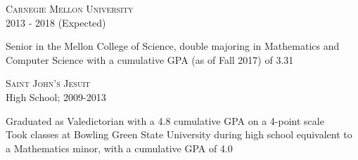 \documentclass[letterpaper,10pt]{article}
\newenvironment{resumecols2}[2]
{
    \vspace{.075cm}
    \begin{minipage}[t]{.22\textwidth}
        \begin{flushright}
            \textsc{#1} \\
            \small{#2}
        \end{flushright}
    \end{minipage}
    \hspace{.005\textwidth}
    \begin{minipage}[t]{.7625\textwidth}
        \begin{flushleft}
}
{
        \end{flushleft}
    \end{minipage}
    \vspace{.075cm}
}
\begin{document}
\begin{resumecols2}{Carnegie Mellon University}{2013 - 2018 (Expected)}
    Senior in the Mellon College of Science, double majoring in Mathematics and Computer Science with a cumulative GPA (as of Fall 2017) of 3.31
\end{resumecols2}

\begin{resumecols2}{Saint John's Jesuit}{High School; 2009-2013}
    Graduated as Valedictorian with a 4.8 cumulative GPA on a 4-point scale \\
    \vspace{4pt}
    Took classes at Bowling Green State University during high school equivalent to a Mathematics minor, with a cumulative GPA of 4.0
\end{resumecols2}
\end{document}
